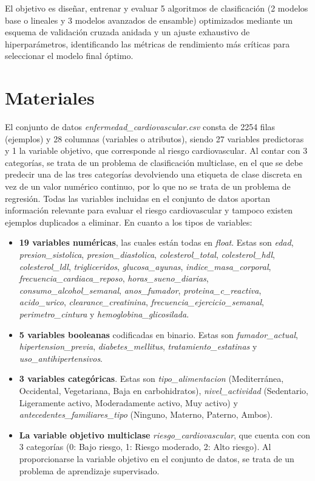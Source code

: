 \documentclass[journal,onecolumn]{IEEEtran}
\begin{document}
El objetivo es diseñar, entrenar y evaluar 5 algoritmos de clasificación (2 modelos base o lineales y 3 modelos avanzados de ensamble) optimizados mediante un esquema de validación cruzada anidada y un ajuste exhaustivo de hiperparámetros, identificando las métricas de rendimiento más críticas para seleccionar el modelo final óptimo.

\section{Materiales}
El conjunto de datos \textit{enfermedad\_cardiovascular.csv} consta de 2254 filas (ejemplos) y 28 columnas (variables o atributos), siendo 27 variables predictoras y 1 la variable objetivo, que corresponde al riesgo cardiovascular. Al contar con 3 categorías, se trata de un problema de clasificación multiclase, en el que se debe predecir una de las tres categorías devolviendo una etiqueta de clase discreta en vez de un valor numérico continuo, por lo que no se trata de un problema de regresión. Todas las variables incluidas en el conjunto de datos aportan información relevante para evaluar el riesgo cardiovascular y tampoco existen ejemplos duplicados a eliminar. En cuanto a los tipos de variables:

\begin{itemize}
    \item \textbf{19 variables numéricas}, las cuales están todas en \textit{float}. Estas son \textit{edad}, \textit{presion\_sistolica}, \textit{presion\_diastolica}, \textit{colesterol\_total}, \textit{colesterol\_hdl}, \textit{colesterol\_ldl}, \textit{trigliceridos}, \textit{glucosa\_ayunas}, \textit{indice\_masa\_corporal}, \textit{frecuencia\_cardiaca\_reposo}, \textit{horas\_sueno\_diarias}, \textit{consumo\_alcohol\_semanal}, \textit{anos\_fumador}, \textit{proteina\_c\_reactiva}, \textit{acido\_urico}, \textit{clearance\_creatinina}, \textit{frecuencia\_ejercicio\_semanal}, \textit{perimetro\_cintura} y \textit{hemoglobina\_glicosilada}.
    
    \item \textbf{5 variables booleanas} codificadas en binario. Estas son \textit{fumador\_actual}, \textit{hipertension\_previa}, \textit{diabetes\_mellitus}, \textit{tratamiento\_estatinas} y \textit{uso\_antihipertensivos}.

    \item \textbf{3 variables categóricas}. Estas son \textit{tipo\_alimentacion} (Mediterránea, Occidental, Vegetariana, Baja en carbohidratos), \textit{nivel\_actividad} (Sedentario, Ligeramente activo, Moderadamente activo, Muy activo) y \textit{antecedentes\_familiares\_tipo} (Ninguno, Materno, Paterno, Ambos).

    \item \textbf{La variable objetivo multiclase} \textit{riesgo\_cardiovascular}, que cuenta con con 3 categorías (0: Bajo riesgo, 1: Riesgo moderado, 2: Alto riesgo). Al proporcionarse la variable objetivo en el conjunto de datos, se trata de un problema de aprendizaje supervisado.
\end{itemize}
\end{document}
